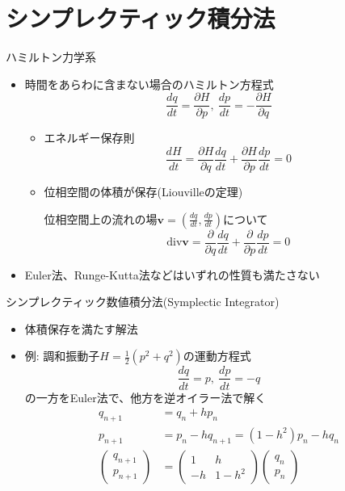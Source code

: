 \documentclass[dvipdfmx]{beamer}
\begin{document}
\section{シンプレクティック積分法}

\begin{frame}[t,fragile]{ハミルトン力学系}
  \begin{itemize}
  \item 時間をあらわに含まない場合のハミルトン方程式
    \[
    \frac{dq}{dt} = \frac{\partial H}{\partial p}, \ \frac{dp}{dt} = -\frac{\partial H}{\partial q}
    \]
    \begin{itemize}
    \item エネルギー保存則
      \[
      \frac{dH}{dt} = \frac{\partial H}{\partial q} \frac{dq}{dt} + \frac{\partial H}{\partial p} \frac{dp}{dt} = 0
      \]
    \item 位相空間の体積が保存(Liouvilleの定理)

      位相空間上の流れの場$\bm{v} = (\frac{dq}{dt},\frac{dp}{dt})$について
      \[
      \text{div} \bm{v} = \frac{\partial}{\partial q} \frac{dq}{dt} + \frac{\partial}{\partial p} \frac{dp}{dt} = 0
      \]
    \end{itemize}
  \item Euler法、Runge-Kutta法などはいずれの性質も満たさない
  \end{itemize}
\end{frame}

\begin{frame}[t,fragile]{シンプレクティック数値積分法(Symplectic Integrator)}
  \begin{itemize}
  \item 体積保存を満たす解法
  \item 例: 調和振動子$H=\frac{1}{2}(p^2+q^2)$の運動方程式
    \[
    \frac{dq}{dt} = p, \ \frac{dp}{dt} = -q
    \]
    の一方をEuler法で、他方を逆オイラー法で解く
    \begin{align*}
      q_{n+1} &= q_n + h p_n \\
      p_{n+1} &= p_n - h q_{n+1} = (1-h^2) p_n - h q_n \\
      \begin{pmatrix} q_{n+1} \\ p_{n+1} \end{pmatrix} &= \begin{pmatrix} 1 & h \\ -h & 1-h^2 \end{pmatrix} \begin{pmatrix} q_{n} \\ p_{n} \end{pmatrix}
    \end{align*}
  \end{itemize}
\end{frame}
\end{document}
